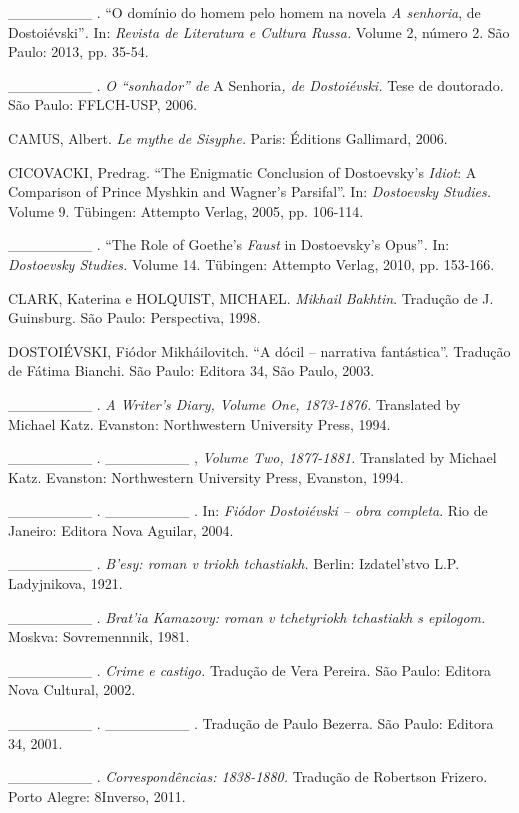\_\_\_\_\_\_\_\_ . ``O domínio do homem pelo homem na novela \emph{A
senhoria}, de Dostoiévski''\emph{.} In: \emph{Revista de Literatura e
Cultura Russa.} Volume 2, número 2. São Paulo: 2013, pp. 35-54.

\_\_\_\_\_\_\_\_ . \emph{O ``sonhador'' de} A Senhoria\emph{, de
Dostoiévski.} Tese de doutorado. São Paulo: FFLCH-USP, 2006.

CAMUS, Albert. \emph{Le mythe de Sisyphe.} Paris: Éditions Gallimard,
2006.

CICOVACKI, Predrag. ``The Enigmatic Conclusion of Dostoevsky's
\emph{Idiot}: A Comparison of Prince Myshkin and Wagner's Parsifal''.
In: \emph{Dostoevsky Studies.} Volume 9. Tübingen: Attempto Verlag,
2005, pp. 106-114.

\_\_\_\_\_\_\_\_ . ``The Role of Goethe's \emph{Faust} in Dostoevsky's
Opus''\emph{.} In: \emph{Dostoevsky Studies.} Volume 14. Tübingen:
Attempto Verlag, 2010, pp. 153-166.

CLARK, Katerina e HOLQUIST, MICHAEL. \emph{Mikhail Bakhtin}. Tradução de
J. Guinsburg. São Paulo: Perspectiva, 1998.

DOSTOIÉVSKI, Fiódor Mikháilovitch. ``A dócil -- narrativa fantástica''.
Tradução de Fátima Bianchi. São Paulo: Editora 34, São Paulo, 2003.

\_\_\_\_\_\_\_\_ . \emph{A Writer's Diary, Volume One, 1873-1876.}
Translated by Michael Katz. Evanston: Northwestern University Press,
1994.

\_\_\_\_\_\_\_\_ . \_\_\_\_\_\_\_\_ , \emph{Volume Two, 1877-1881.}
Translated by Michael Katz. Evanston: Northwestern University Press,
Evanston, 1994.

\_\_\_\_\_\_\_\_ . \_\_\_\_\_\_\_\_ . In: \emph{Fiódor Dostoiévski --
obra completa}. Rio de Janeiro: Editora Nova Aguilar, 2004.

\_\_\_\_\_\_\_\_ . \emph{B'esy: roman v triokh tchastiakh.} Berlin:
Izdatel'stvo L.P. Ladyjnikova, 1921.

\_\_\_\_\_\_\_\_ . \emph{Brat'ia Kamazovy: roman v tchetyriokh
tchastiakh s epilogom.} Moskva: Sovremennnik, 1981.

\_\_\_\_\_\_\_\_ . \emph{Crime e castigo.} Tradução de Vera Pereira. São
Paulo: Editora Nova Cultural, 2002.

\_\_\_\_\_\_\_\_ . \_\_\_\_\_\_\_\_ . Tradução de Paulo Bezerra. São
Paulo: Editora 34, 2001.

\_\_\_\_\_\_\_\_ . \emph{Correspondências: 1838-1880.} Tradução de
Robertson Frizero. Porto Alegre: 8Inverso, 2011.

